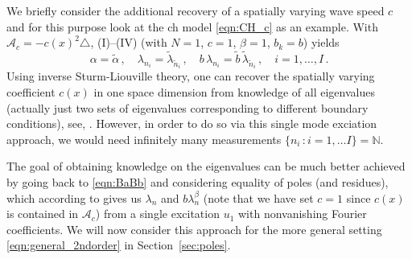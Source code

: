 We briefly consider the additional recovery of a spatially varying wave speed $c$ and for this purpose look at  the {\sc ch} model \eqref{eqn:CH_c} as an example.
With $\mathcal{A}_c=-c(x)^2\triangle$, (I)--(IV) (with $N=1$, $c=1$, $\beta=1$, $b_{k}=b$) yields
\[
\alpha=\tilde{\alpha}\,, \quad 
\lambda_{n_i}=\tilde{\lambda}_{\tilde{n}_i}\,, \quad 
b\,\lambda_{n_i}=\tilde{b}\,\tilde{\lambda}_{\tilde{n}_i}\,, \quad i=1,\ldots,I\,.
\]
Using inverse Sturm-Liouville theory, one can recover the spatially varying coefficient $c(x)$ in one space dimension from knowledge of all eigenvalues (actually just two sets of eigenvalues corresponding to different boundary conditions),
see, \cite{RundellSacks:1992b,CCPR:1997}.
However, in order to do so via this single mode exciation approach, we would need infinitely many measurements
$\{n_i\, : i=1,\ldots I\}=\mathbb{N}$.

The goal of obtaining knowledge on the eigenvalues can be much better achieved by going back to \eqref{eqn:BaBb} and considering equality of poles (and residues), which according to 
\cite[Section 4]{KaltenbacherRundell:2021b}
gives us $\lambda_n$ and $b\lambda_n^\beta$ (note that we have set $c=1$ since $c(x)$ is contained in $\mathcal{A}_c$) from a single excitation $u_1$ with nonvanishing Fourier coefficients. We will now consider this approach for the more general setting \eqref{eqn:general_2ndorder} in Section~\ref{sec:poles}.

